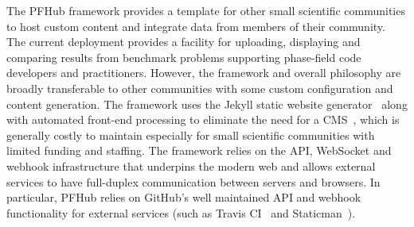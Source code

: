 \documentclass{jors}
\begin{document}
The PFHub framework provides a template for other small scientific
communities to host custom content and integrate data from members of
their community. The current deployment provides a facility for
uploading, displaying and comparing results from benchmark problems
supporting phase-field code developers and practitioners. However, the
framework and overall philosophy are broadly transferable to other
communities with some custom configuration and content generation. The
framework uses the Jekyll static website generator~\cite{jekyll} along
with automated front-end processing to eliminate the need for a
CMS~\cite{cmsfree}, which is generally costly to maintain especially
for small scientific communities with limited funding and staffing.
The framework relies on the API, WebSocket and webhook infrastructure
that underpins the modern web and allows external services to have
full-duplex communication between servers and browsers. In particular,
PFHub relies on GitHub's well maintained API and webhook functionality
for external services (such as Travis CI~\cite{travis} and
Staticman~\cite{staticman}).
\end{document}

